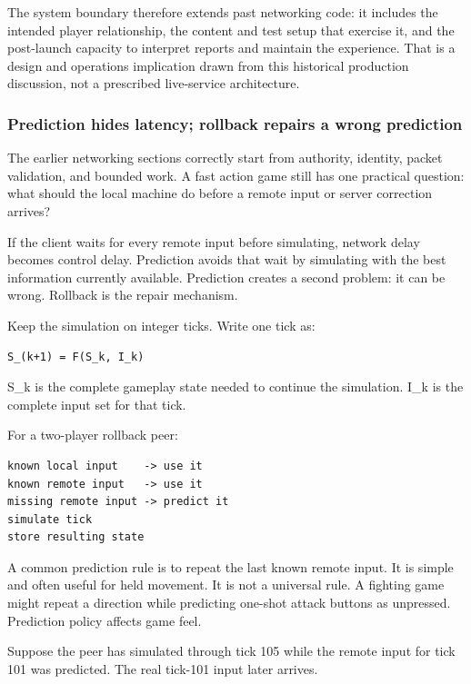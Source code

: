 The system boundary therefore extends past networking code: it includes the intended player relationship, the content and test setup that exercise it, and the post-launch capacity to interpret reports and maintain the experience. That is a design and operations implication drawn from this historical production discussion, not a prescribed live-service architecture.

\subsubsection{Prediction hides latency; rollback repairs a wrong prediction}\label{prediction-hides-latency-rollback-repairs-a-wrong-prediction}

The earlier networking sections correctly start from authority, identity, packet validation, and bounded work. A fast action game still has one practical question: what should the local machine do before a remote input or server correction arrives?

If the client waits for every remote input before simulating, network delay becomes control delay. Prediction avoids that wait by simulating with the best information currently available. Prediction creates a second problem: it can be wrong. Rollback is the repair mechanism.

Keep the simulation on integer ticks. Write one tick as:

\begin{verbatim}
S_(k+1) = F(S_k, I_k)
\end{verbatim}

S\_k is the complete gameplay state needed to continue the simulation. I\_k is the complete input set for that tick.

For a two-player rollback peer:

\begin{verbatim}
known local input    -> use it
known remote input   -> use it
missing remote input -> predict it
simulate tick
store resulting state
\end{verbatim}

A common prediction rule is to repeat the last known remote input. It is simple and often useful for held movement. It is not a universal rule. A fighting game might repeat a direction while predicting one-shot attack buttons as unpressed. Prediction policy affects game feel.

Suppose the peer has simulated through tick 105 while the remote input for tick 101 was predicted. The real tick-101 input later arrives.

